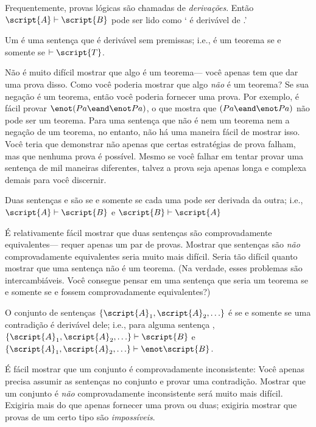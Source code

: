 Frequentemente, provas lógicas são chamadas de \emph{derivações}. Então $\script{A}\vdash\script{B}$ pode ser lido como ` é derivável de .'

Um  é uma sentença que é derivável sem premissas; i.e.,  é um teorema se e somente se $\vdash\script{T}$.

Não é muito difícil mostrar que algo é um teorema--- você apenas tem que dar uma prova disso. Como você poderia mostrar que algo \emph{não} é um teorema? Se sua negação é um teorema, então você poderia fornecer uma prova. Por exemplo, é fácil provar $\enot(Pa \eand \enot Pa)$, o que mostra que $(Pa \eand \enot Pa)$ não pode ser um teorema. Para uma sentença que não é nem um teorema nem a negação de um teorema, no entanto, não há uma maneira fácil de mostrar isso. Você teria que demonstrar não apenas que certas estratégias de prova falham, mas que nenhuma prova é possível. Mesmo se você falhar em tentar provar uma sentença de mil maneiras diferentes, talvez a prova seja apenas longa e complexa demais para você discernir.

Duas sentenças  e  são  se e somente se cada uma pode ser derivada da outra; i.e., $\script{A}\vdash\script{B}$ e $\script{B}\vdash\script{A}$

É relativamente fácil mostrar que duas sentenças são comprovadamente equivalentes--- requer apenas um par de provas. Mostrar que sentenças são \emph{não} comprovadamente equivalentes seria muito mais difícil. Seria tão difícil quanto mostrar que uma sentença não é um teorema. (Na verdade, esses problemas são intercambiáveis. Você consegue pensar em uma sentença que seria um teorema se e somente se  e  fossem comprovadamente equivalentes?)

O conjunto de sentenças $\{\script{A}_1,\script{A}_2,\ldots\}$ é  se e somente se uma contradição é derivável dele; i.e., para alguma sentença , $\{\script{A}_1,\script{A}_2,\ldots\}\vdash\script{B}$ e $\{\script{A}_1,\script{A}_2,\ldots\}\vdash\enot \script{B}$.

É fácil mostrar que um conjunto é comprovadamente inconsistente: Você apenas precisa assumir as sentenças no conjunto e provar uma contradição. Mostrar que um conjunto é \emph{não} comprovadamente inconsistente será muito mais difícil. Exigiria mais do que apenas fornecer uma prova ou duas; exigiria mostrar que provas de um certo tipo são \emph{impossíveis}.








